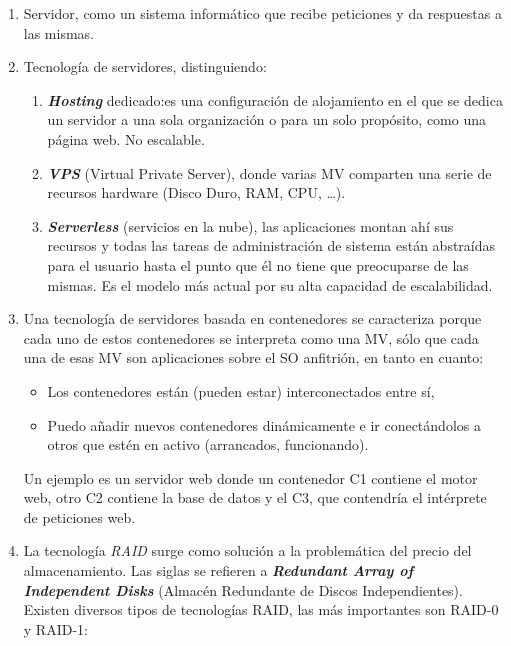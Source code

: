 \documentclass[
]{book}
\providecommand{\tightlist}{%
  \setlength{\itemsep}{0pt}\setlength{\parskip}{0pt}}
\begin{document}
\begin{enumerate}
\def\labelenumi{\arabic{enumi}.}
\item
  Servidor, como un sistema informático que recibe peticiones y da respuestas a las mismas.
\item
  Tecnología de servidores, distinguiendo:

  \begin{enumerate}
  \def\labelenumii{\alph{enumii}.}
  \tightlist
  \item
    \textbf{\emph{Hosting}} dedicado:es una configuración de alojamiento en el que se dedica un servidor a una sola organización o para un solo propósito, como una página web. No escalable.
  \item
    \textbf{\emph{VPS}} (Virtual Private Server), donde varias MV comparten una serie de recursos hardware (Disco Duro, RAM, CPU, \ldots).
  \item
    \textbf{\emph{Serverless}} (servicios en la nube), las aplicaciones montan ahí sus recursos y todas las tareas de administración de sistema están abstraídas para el usuario hasta el punto que él no tiene que preocuparse de las mismas. Es el modelo más actual por su alta capacidad de escalabilidad.
  \end{enumerate}
\item
  Una tecnología de servidores basada en contenedores se caracteriza porque cada uno de estos contenedores se interpreta como una MV, sólo que cada una de esas MV son aplicaciones sobre el SO anfitrión, en tanto en cuanto:

  \begin{itemize}
  \tightlist
  \item
    Los contenedores están (pueden estar) interconectados entre sí,
  \item
    Puedo añadir nuevos contenedores dinámicamente e ir conectándolos a otros que estén en activo (arrancados, funcionando).
  \end{itemize}

  Un ejemplo es un servidor web donde un contenedor C1 contiene el motor web, otro C2 contiene la base de datos y el C3, que contendría el intérprete de peticiones web.
\item
  La tecnología \emph{RAID} surge como solución a la problemática del precio del almacenamiento. Las siglas se refieren a \textbf{\emph{Redundant Array of Independent Disks}} (Almacén Redundante de Discos Independientes). Existen diversos tipos de tecnologías RAID, las más importantes son RAID-0 y RAID-1:


\end{enumerate}
\end{document}
